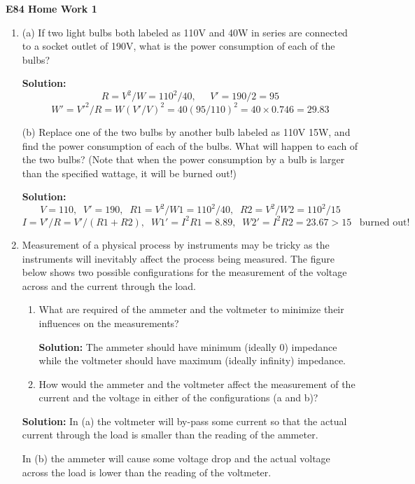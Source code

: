 \usepackage{html}

\begin{center}
{\Large \bf E84 Home Work 1}
\end{center}
\begin{enumerate}

\item (a) If two light bulbs both labeled as 110V and 40W in series are
connected to a socket outlet of 190V, what is the power consumption of 
each of the bulbs?

{\bf Solution:}
\[ R=V^2/W=110^2/40,\;\;\;\;\; V'=190/2=95	\]
\[ W'=V'^2/R=W (V'/V)^2=40 (95/110)^2=40\times 0.746=29.83	\]

(b) Replace one of the two bulbs by another bulb labeled as 110V 15W, and
find the power consumption of each of the bulbs. What will happen to each
of the two bulbs? (Note that when the power consumption by a bulb is larger
than the specified wattage, it will be burned out!)

{\bf Solution:}
\[ V=110,\;\;V'=190,\;\;R1=V^2/W1=110^2/40,\;\;R2=V^2/W2=110^2/15	\]
\[ I=V'/R=V'/(R1+R2),\;\; W1'=I^2 R1=8.89,\;\;W2'=I^2 R2=23.67>15\;\;\;
	\mbox{burned out!}	\]

\item Measurement of a physical process by instruments may be tricky as
the instruments will inevitably affect the process being measured. The 
figure below shows two possible configurations for the measurement of the
voltage across and the current through the load. 


\begin{enumerate}
\item What are required of the ammeter and the voltmeter to minimize their
	influences on the measurements? 

{\bf Solution:}
The ammeter should have minimum (ideally 0) impedance while the voltmeter
should have maximum (ideally infinity) impedance. 

\item How would the ammeter and the voltmeter affect the measurement of the
	current and the voltage in either of the configurations (a and b)?
\end{enumerate}

{\bf Solution:}
In (a) the voltmeter will by-pass some current so that the actual current
through the load is smaller than the reading of the ammeter.

In (b) the ammeter will cause some voltage drop and the actual voltage 
across the load is lower than the reading of the voltmeter. 


\end{enumerate}
